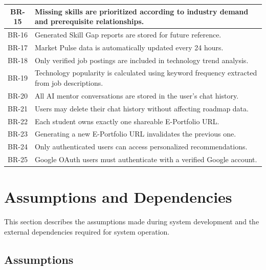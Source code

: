 \begin{table}[H]
\begin{tabular}{|c|p{11cm}|}
BR-15 &
Missing skills are prioritized according to industry demand and prerequisite relationships.
\\ \hline

BR-16 &
Generated Skill Gap reports are stored for future reference.
\\ \hline

BR-17 &
Market Pulse data is automatically updated every 24 hours.
\\ \hline

BR-18 &
Only verified job postings are included in technology trend analysis.
\\ \hline

BR-19 &
Technology popularity is calculated using keyword frequency extracted from job descriptions.
\\ \hline

BR-20 &
All AI mentor conversations are stored in the user's chat history.
\\ \hline

BR-21 &
Users may delete their chat history without affecting roadmap data.
\\ \hline

BR-22 &
Each student owns exactly one shareable E-Portfolio URL.
\\ \hline

BR-23 &
Generating a new E-Portfolio URL invalidates the previous one.
\\ \hline

BR-24 &
Only authenticated users can access personalized recommendations.
\\ \hline

BR-25 &
Google OAuth users must authenticate with a verified Google account.
\\ \hline

\end{tabular}
\end{table}


\section{Assumptions and Dependencies}

This section describes the assumptions made during system development and the external dependencies required for system operation.

\subsection{Assumptions}

